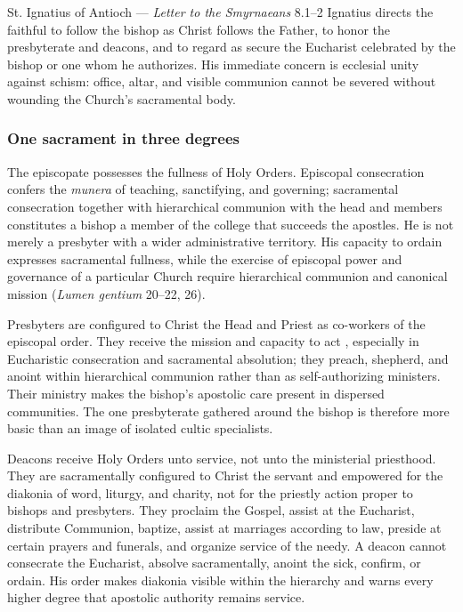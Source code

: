 \begin{sourcecard}{St. Ignatius of Antioch --- \emph{Letter to the Smyrnaeans} 8.1--2}
Ignatius directs the faithful to follow the bishop as Christ follows the Father, to honor the presbyterate and deacons, and to regard as secure the Eucharist celebrated by the bishop or one whom he authorizes. His immediate concern is ecclesial unity against schism: office, altar, and visible communion cannot be severed without wounding the Church's sacramental body.
\end{sourcecard}

\subsubsection{One sacrament in three degrees}

The episcopate possesses the fullness of Holy Orders. Episcopal consecration confers the \emph{munera} of teaching, sanctifying, and governing; sacramental consecration together with hierarchical communion with the head and members constitutes a bishop a member of the college that succeeds the apostles. He is not merely a presbyter with a wider administrative territory. His capacity to ordain expresses sacramental fullness, while the exercise of episcopal power and governance of a particular Church require hierarchical communion and canonical mission (\emph{Lumen gentium} 20--22, 26).

Presbyters are configured to Christ the Head and Priest as co-workers of the episcopal order. They receive the mission and capacity to act , especially in Eucharistic consecration and sacramental absolution; they preach, shepherd, and anoint within hierarchical communion rather than as self-authorizing ministers. Their ministry makes the bishop's apostolic care present in dispersed communities. The one presbyterate gathered around the bishop is therefore more basic than an image of isolated cultic specialists.

Deacons receive Holy Orders unto service, not unto the ministerial priesthood. They are sacramentally configured to Christ the servant and empowered for the diakonia of word, liturgy, and charity, not for the priestly action  proper to bishops and presbyters. They proclaim the Gospel, assist at the Eucharist, distribute Communion, baptize, assist at marriages according to law, preside at certain prayers and funerals, and organize service of the needy. A deacon cannot consecrate the Eucharist, absolve sacramentally, anoint the sick, confirm, or ordain. His order makes diakonia visible within the hierarchy and warns every higher degree that apostolic authority remains service.

